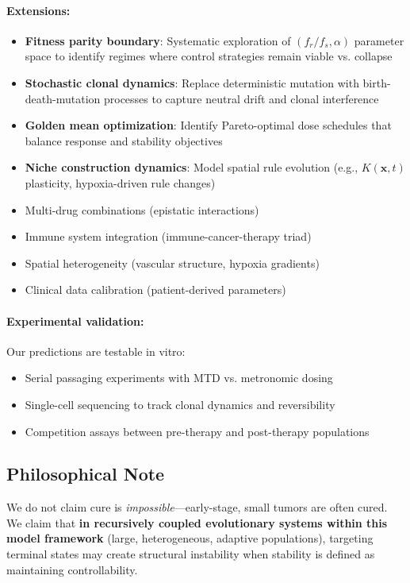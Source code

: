 \documentclass[11pt,a4paper]{article}
\begin{document}
\paragraph{Extensions:}
\begin{itemize}
    \item \textbf{Fitness parity boundary}: Systematic exploration of $(f_r/f_s, \alpha)$ parameter space to identify regimes where control strategies remain viable vs. collapse
    \item \textbf{Stochastic clonal dynamics}: Replace deterministic mutation with birth-death-mutation processes to capture neutral drift and clonal interference
    \item \textbf{Golden mean optimization}: Identify Pareto-optimal dose schedules that balance response and stability objectives
    \item \textbf{Niche construction dynamics}: Model spatial rule evolution (e.g., $K(\mathbf{x}, t)$ plasticity, hypoxia-driven rule changes)
    \item Multi-drug combinations (epistatic interactions)
    \item Immune system integration (immune-cancer-therapy triad)
    \item Spatial heterogeneity (vascular structure, hypoxia gradients)
    \item Clinical data calibration (patient-derived parameters)
\end{itemize}

\paragraph{Experimental validation:}
Our predictions are testable in vitro:
\begin{itemize}
    \item Serial passaging experiments with MTD vs. metronomic dosing
    \item Single-cell sequencing to track clonal dynamics and reversibility
    \item Competition assays between pre-therapy and post-therapy populations
\end{itemize}

\subsection{Philosophical Note}

We do not claim cure is \textit{impossible}---early-stage, small tumors are often cured. We claim that \textbf{in recursively coupled evolutionary systems within this model framework} (large, heterogeneous, adaptive populations), targeting terminal states may create structural instability when stability is defined as maintaining controllability.
\end{document}
